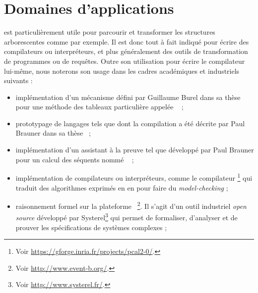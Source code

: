 


\section{Domaines d'applications}

{\tom} est particulièrement utile pour parcourir et transformer les structures
arborescentes comme {\xml} par exemple. Il est donc tout à fait indiqué pour
écrire des compilateurs ou interpréteurs, et plus généralement des outils de
transformation de programmes ou de requêtes. Outre son utilisation pour écrire
le compilateur {\tom} lui-même, nous noterons son usage dans les cadres
académiques et industriels suivants :
\begin{itemize}

  \item implémentation d'un mécanisme défini par Guillaume Burel dans sa
    thèse~\cite{burel09} pour une méthode des tableaux particulière appelée
    {\tamed}~\cite{bonichon04} ;
    
  \item prototypage de langages tels que {\miniml} dont la compilation a été
    décrite par Paul Brauner dans sa thèse~\cite{brauner10} ; 

  \item implémentation d'un assistant à la preuve tel que {\lemuridae}
    développé par Paul Brauner pour un calcul des séquents nommé
    {\lkms}~\cite{brauner10} ;

  \item implémentation de compilateurs ou interpréteurs, comme le
  compilateur {\pluscaltwo}
  \footnote{Voir \url{https://gforge.inria.fr/projects/pcal2-0/}.} qui traduit des
  algorithmes exprimés en {\pluscal} en {\tlaplus} pour faire du
  \emph{model-checking} ;

  \item raisonnement formel sur la plateforme
    {\rodin}~\footnote{Voir \url{http://www.event-b.org/}.}. Il s'agit d'un outil
    industriel \emph{open source} développé par
    Systerel\footnote{Voir \url{http://www.systerel.fr/}.} qui permet de formaliser,
    d'analyser et de prouver les spécifications de systèmes complexes ;




\end{itemize}

